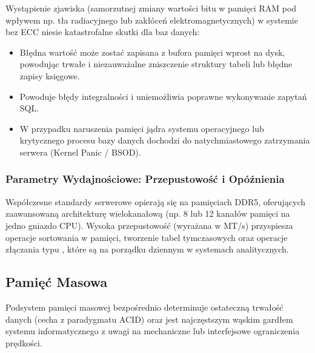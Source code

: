 \documentclass[a4paper,11pt,english,openany,oneside]{sphinxmanual}
\begin{document}
\sphinxAtStartPar
Wystąpienie zjawiska  (samorzutnej zmiany wartości bitu w pamięci RAM pod wpływem np. tła radiacyjnego lub zakłóceń elektromagnetycznych) w systemie bez ECC niesie katastrofalne skutki dla baz danych:
\begin{itemize}
\item {} 
\sphinxAtStartPar
{} Błędna wartość może zostać zapisana z bufora pamięci wprost na dysk, powodując trwałe i niezauważalne zniszczenie struktury tabeli lub błędne zapisy księgowe.

\item {} 
\sphinxAtStartPar
{} Powoduje błędy integralności i uniemożliwia poprawne wykonywanie zapytań SQL.

\item {} 
\sphinxAtStartPar
{} W przypadku naruszenia pamięci jądra systemu operacyjnego lub krytycznego procesu bazy danych dochodzi do natychmiastowego zatrzymania serwera (Kernel Panic / BSOD).

\end{itemize}


\subsubsection{Parametry Wydajnościowe: Przepustowość i Opóźnienia}
\label{\detokenize{rozdzial_2/rozdzial_21/index:parametry-wydajnosciowe-przepustowosc-i-opoznienia}}
\sphinxAtStartPar
Współczesne standardy serwerowe opierają się na pamięciach DDR5, oferujących zaawansowaną architekturę wielokanałową (np. 8 lub 12 kanałów pamięci na jedno gniazdo CPU). Wysoka przepustowość (wyrażana w MT/s) przyspiesza operacje sortowania w pamięci, tworzenie tabel tymczasowych oraz operacje złączania typu , które są na porządku dziennym w systemach analitycznych.


\subsection{Pamięć Masowa}
\label{\detokenize{rozdzial_2/rozdzial_21/index:pamiec-masowa}}
\sphinxAtStartPar
Podsystem pamięci masowej bezpośrednio determinuje ostateczną trwałość danych (cecha  z paradygmatu ACID) oraz jest najczęstszym wąskim gardłem systemu informatycznego z uwagi na mechaniczne lub interfejsowe ograniczenia prędkości.
\end{document}

